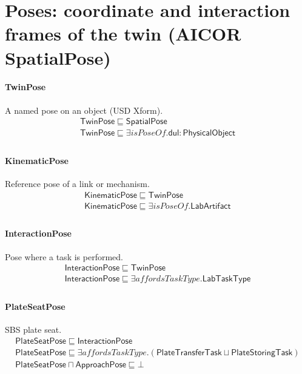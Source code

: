 \documentclass[10pt]{article}
\begin{document}
\section*{Poses: coordinate and interaction frames of the twin (AICOR SpatialPose)}
\paragraph{TwinPose} A named pose on an object (USD Xform).
\[\begin{array}{l}
\mathsf{TwinPose} \sqsubseteq  \mathsf{SpatialPose} \\
\mathsf{TwinPose} \sqsubseteq  \exists \mathit{isPoseOf}.\mathsf{dul{:}PhysicalObject} \\
\end{array}\]
\paragraph{KinematicPose} Reference pose of a link or mechanism.
\[\begin{array}{l}
\mathsf{KinematicPose} \sqsubseteq  \mathsf{TwinPose} \\
\mathsf{KinematicPose} \sqsubseteq  \exists \mathit{isPoseOf}.\mathsf{LabArtifact} \\
\end{array}\]
\paragraph{InteractionPose} Pose where a task is performed.
\[\begin{array}{l}
\mathsf{InteractionPose} \sqsubseteq  \mathsf{TwinPose} \\
\mathsf{InteractionPose} \sqsubseteq  \exists \mathit{affordsTaskType}.\mathsf{LabTaskType} \\
\end{array}\]
\paragraph{PlateSeatPose} SBS plate seat.
\[\begin{array}{l}
\mathsf{PlateSeatPose} \sqsubseteq  \mathsf{InteractionPose} \\
\mathsf{PlateSeatPose} \sqsubseteq  \exists \mathit{affordsTaskType}.(\mathsf{PlateTransferTask} \sqcup  \mathsf{PlateStoringTask}) \\
\mathsf{PlateSeatPose} \sqcap  \mathsf{ApproachPose} \sqsubseteq  \bot  \\
\end{array}\]
\end{document}
